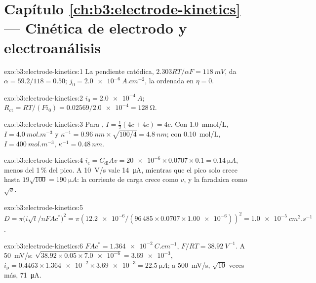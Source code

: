 \section*{Capítulo \ref{ch:b3:electrode-kinetics} --- Cinética de electrodo y electroanálisis}

\begin{solution}{exo:b3:electrode-kinetics:1}
La pendiente catódica, $2.303RT/\alpha F = \qty{118}{mV}$, da $\alpha = 59.2/118 = 0.50$; $j_0 = \qty{2.0e-6}{A.cm^{-2}}$,
la ordenada en $\eta = 0$.
\end{solution}

\begin{solution}{exo:b3:electrode-kinetics:2}
$i_0 = \qty{2.0e-4}{A}$; $R_{\mathrm{ct}} = RT/(Fi_0) = 0.02569/\num{2.0e-4} = \qty{128}{\ohm}$.
\end{solution}

\begin{solution}{exo:b3:electrode-kinetics:3}
Para , $I = \frac12(4c + 4c) = 4c$. Con \qty{1.0}{mmol/L}, $I = \qty{4.0}{mol.m^{-3}}$ y $\kappa^{-1} =
\qty{0.96}{nm} \times \sqrt{100/4} = \qty{4.8}{nm}$; con \qty{0.10}{mol/L}, $I = \qty{400}{mol.m^{-3}}$, $\kappa^{-1} = \qty{0.48}{nm}$.
\end{solution}

\begin{solution}{exo:b3:electrode-kinetics:4}
$i_{\mathrm c} = C_{\mathrm{dl}}Av = \num{20e-6} \times 0.0707 \times 0.1 = \qty{0.14}{\micro A}$, menos del 1\,\% del pico. A
\qty{10}{V/s} vale \qty{14}{\micro A}, mientras que el pico solo crece hasta $19\sqrt{100} = \qty{190}{\micro A}$:
la corriente de carga crece como $v$, y la faradaica como $\sqrt v$.
\end{solution}

\begin{solution}{exo:b3:electrode-kinetics:5}
$D = \pi\bigl(i\sqrt t/nFAc^*\bigr)^2 = \pi(\num{12.2e-6}/(96\,485 \times 0.0707 \times \num{1.00e-6}))^2 =
\qty{1.0e-5}{cm^2.s^{-1}}$.
\end{solution}

\begin{solution}{exo:b3:electrode-kinetics:6}
$FAc^* = \qty{1.364e-2}{C.cm^{-1}}$, $F/RT = \qty{38.92}{V^{-1}}$. A \qty{50}{mV/s}: $\sqrt{38.92 \times 0.05 \times \num{7.0e-6}} =
\num{3.69e-3}$, $i_{\mathrm p} = 0.4463 \times \num{1.364e-2} \times \num{3.69e-3} = \qty{22.5}{\micro A}$; a \qty{500}{mV/s}, $\sqrt{10}$ veces
más, \qty{71}{\micro A}.
\end{solution}

